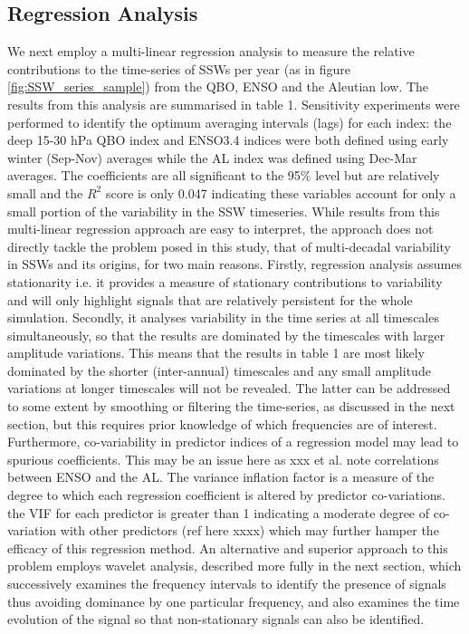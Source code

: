 \subsection{Regression Analysis}
We next employ a multi-linear regression analysis to measure the relative contributions to the time-series of SSWs per year (as in figure \ref{fig:SSW_series_sample}) from the QBO, ENSO and the Aleutian low. The results from this analysis are summarised in table 1.  Sensitivity experiments were performed to identify the optimum averaging intervals (lags) for each index: the deep 15-30 hPa QBO index and ENSO3.4 indices  were both defined using early winter (Sep-Nov) averages while the AL index was defined using Dec-Mar averages. The coefficients are all significant to the 95\% level but are relatively small and the $R^2$ score is only 0.047 indicating these variables account for only a small portion of the variability in the SSW timeseries. While results from this multi-linear regression approach are easy to interpret, the approach does not directly tackle the problem posed in this study, that of multi-decadal variability in SSWs and its origins, for two main reasons. Firstly, regression analysis assumes stationarity i.e. it provides a measure of stationary contributions to variability and will only highlight signals that are relatively persistent for the whole simulation. Secondly, it  analyses variability in the time series at all timescales simultaneously, so that the results are dominated by the timescales with larger amplitude variations.  This means that the results in table 1 are most likely dominated by the shorter (inter-annual) timescales and any small amplitude variations at longer timescales will not be revealed. The latter can be addressed to some extent by smoothing or filtering the time-series, as discussed in the next section, but this requires prior knowledge of which frequencies are of interest. Furthermore, co-variability in predictor indices of a regression model may lead to spurious coefficients. This may be an issue here as xxx et al. note correlations between ENSO and the AL. The variance inflation factor is a measure of the degree to which each regression coefficient is altered by predictor co-variations. the VIF for each predictor is greater than 1 indicating a moderate degree of co-variation with other predictors (ref here xxxx) which may further hamper the efficacy of this regression method. An alternative and superior approach to this problem employs wavelet analysis, described more fully in the next section, which successively examines the frequency intervals to identify the presence of signals thus avoiding dominance by one particular frequency, and also examines the time evolution of the signal so that non-stationary signals can also be identified. 

